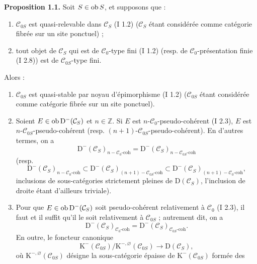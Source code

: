 \documentclass[11pt]{article}
\begin{document}
\textbf{Proposition 1.1.} Soit $S\in\operatorname{ob} S$, et supposons que :
\begin{enumerate}[label=(\roman*)]
\item $\mathcal C_{0S}$ est quasi-relevable dans $\mathcal C_S$ (I 1.2) ($\mathcal C_S$ étant considérée comme catégorie fibrée sur un site ponctuel) ;
\item tout objet de $\mathcal C_S$ qui est de $\mathcal C_0$-type fini (I 1.2) (resp. de $\mathcal C_0$-présentation finie (I 2.8)) est de $\mathcal C_{0S}$-type fini.
\end{enumerate}
Alors :
\begin{enumerate}[label=\alph*)]
\item $\mathcal C_{0S}$ est quasi-stable par noyau d'épimorphisme (I 1.2) ($\mathcal C_{0S}$ étant considérée comme catégorie fibrée sur un site ponctuel).
\item Soient $E\in\operatorname{ob} \mathrm D^{-}(\mathcal C_S)$ et $n\in\mathbb Z$. Si $E$ est $n$-$\mathcal C_0$-pseudo-cohérent (I 2.3), $E$ est $n$-$\mathcal C_{0S}$-pseudo-cohérent (resp. $(n+1)$-$\mathcal C_{0S}$-pseudo-cohérent). En d'autres termes, on a
\[
\mathrm D^{-}(\mathcal C_S)_{n-\mathcal C_0\text{-coh}}
=
\mathrm D^{-}(\mathcal C_S)_{n-\mathcal C_{0S}\text{-coh}}
\]
(resp.
\[
\mathrm D^{-}(\mathcal C_S)_{n-\mathcal C_0\text{-coh}}
\subset
\mathrm D^{-}(\mathcal C_S)_{(n+1)-\mathcal C_{0S}\text{-coh}}
\subset
\mathrm D^{-}(\mathcal C_S)_{(n+1)-\mathcal C_0\text{-coh}},
\]
inclusions de sous-catégories strictement pleines de $\mathrm D(\mathcal C_S)$, l'inclusion de droite étant d'ailleurs triviale).
\item Pour que $E\in\operatorname{ob}\mathrm D^{-}(\mathcal C_S)$ soit pseudo-cohérent relativement à $\mathcal C_0$ (I 2.3), il faut et il suffit qu'il le soit relativement à $\mathcal C_{0S}$ ; autrement dit, on a
\[
\mathrm D^{-}(\mathcal C_S)_{\mathcal C_0\text{-coh}}
=
\mathrm D^{-}(\mathcal C_S)_{\mathcal C_{0S}\text{-coh}}.
\]
En outre, le foncteur canonique
\[
\mathrm K^{-}(\mathcal C_{0S})/\mathrm K^{-,\varnothing}(\mathcal C_{0S})
\longrightarrow \mathrm D(\mathcal C_S),
\]
où $\mathrm K^{-,\varnothing}(\mathcal C_{0S})$ désigne la sous-catégorie épaisse de $\mathrm K^{-}(\mathcal C_{0S})$ formée des

\end{enumerate}
\end{document}
